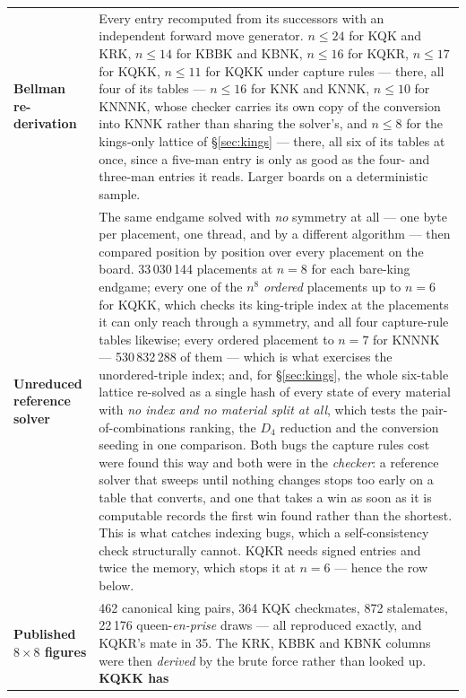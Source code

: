 \documentclass[11pt]{article}
\begin{document}
\begin{center}\small
\begin{tabular}{@{}lp{}@{}}
\toprule
\textbf{Bellman re-derivation} & Every entry recomputed from its successors with
an independent forward move generator. $n \le 24$ for KQK and KRK, $n \le 14$
for KBBK and KBNK, $n \le 16$ for KQKR, $n \le 17$ for KQKK, $n \le 11$ for
KQKK under capture rules --- there, all four of its tables --- $n \le 16$ for
KNK and KNNK, $n \le 10$ for KNNNK, whose checker carries its own copy of
the conversion into KNNK rather than sharing the solver's, and $n \le 8$ for
the kings-only lattice of \S\ref{sec:kings} --- there, all six of its tables at
once, since a five-man entry is only as good as the four- and three-man entries
it reads. Larger boards on a
deterministic sample. \\[2mm]
\textbf{Unreduced reference solver} & The same endgame solved with \emph{no}
symmetry at all --- one byte per placement, one thread, and by a different
algorithm --- then compared position by position over every placement on the
board. 33\,030\,144 placements at $n=8$ for each bare-king endgame; every one
of the $n^8$ \emph{ordered} placements up to $n=6$ for KQKK, which checks its
king-triple index at the placements it can only reach through a symmetry, and
all four capture-rule tables likewise; every ordered placement to $n=7$ for
KNNNK --- 530\,832\,288 of them --- which is what exercises the unordered-triple
index; and, for \S\ref{sec:kings}, the whole six-table lattice re-solved as a
single hash of every state of every material with \emph{no index and no
material split at all}, which tests the pair-of-combinations ranking, the $D_4$
reduction and the conversion seeding in one comparison. Both bugs the capture rules cost were
found this way and both were in the \emph{checker}: a reference solver that
sweeps until nothing changes stops too early on a table that converts, and one
that takes a win as soon as it is computable records the first win found rather
than the shortest. This
is what catches indexing bugs, which a self-consistency check structurally
cannot. KQKR needs signed entries and twice the memory, which stops it at
$n=6$ --- hence the row below. \\[2mm]
\textbf{Published $8\times8$ figures} & 462 canonical king pairs, 364 KQK
checkmates, 872 stalemates, 22\,176 queen-\emph{en-prise} draws --- all
reproduced exactly, and KQKR's mate in 35. The KRK, KBBK and KBNK columns were
then \emph{derived} by the brute force rather than looked up. \textbf{KQKK has
}
\end{tabular}
\end{center}
\end{document}
